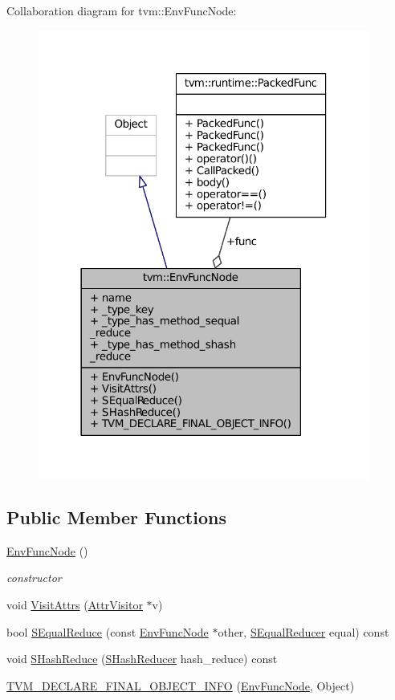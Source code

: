 Collaboration diagram for tvm\+:\+:Env\+Func\+Node\+:
\nopagebreak
\begin{figure}[H]
\begin{center}
\leavevmode
\includegraphics[width=309pt]{classtvm_1_1EnvFuncNode__coll__graph}
\end{center}
\end{figure}
\subsection*{Public Member Functions}
\begin{DoxyCompactItemize}
\item 
\hyperlink{classtvm_1_1EnvFuncNode_a808b81ced7b01c4955b4994a89bc71a4}{Env\+Func\+Node} ()
\begin{DoxyCompactList}\small\item\em constructor \end{DoxyCompactList}\item 
void \hyperlink{classtvm_1_1EnvFuncNode_adab1a481f01261dfaab5414dce4afc10}{Visit\+Attrs} (\hyperlink{classtvm_1_1AttrVisitor}{Attr\+Visitor} $\ast$v)
\item 
bool \hyperlink{classtvm_1_1EnvFuncNode_a1b15e905003c230e45013a922d7d7e37}{S\+Equal\+Reduce} (const \hyperlink{classtvm_1_1EnvFuncNode}{Env\+Func\+Node} $\ast$other, \hyperlink{classtvm_1_1SEqualReducer}{S\+Equal\+Reducer} equal) const 
\item 
void \hyperlink{classtvm_1_1EnvFuncNode_af8522e9ab96eb5570f1c9f2d9ed0eac2}{S\+Hash\+Reduce} (\hyperlink{classtvm_1_1SHashReducer}{S\+Hash\+Reducer} hash\+\_\+reduce) const 
\item 
\hyperlink{classtvm_1_1EnvFuncNode_a5f8074cd3210ba959a2463896acab3be}{T\+V\+M\+\_\+\+D\+E\+C\+L\+A\+R\+E\+\_\+\+F\+I\+N\+A\+L\+\_\+\+O\+B\+J\+E\+C\+T\+\_\+\+I\+N\+FO} (\hyperlink{classtvm_1_1EnvFuncNode}{Env\+Func\+Node}, Object)
\end{DoxyCompactItemize}
